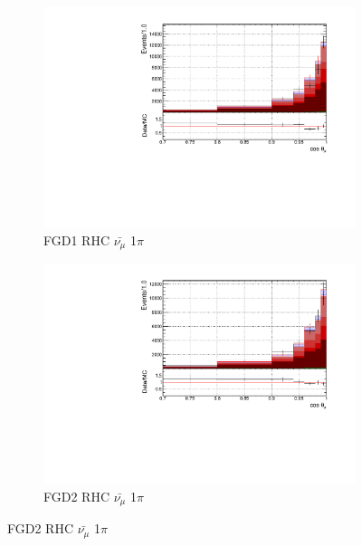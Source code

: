 \begin{figure}[!htbp]
\begin{subfigure}{0.49\textwidth}
  \centering
  \includegraphics[width=\textwidth]{figs/FGD1_anti-numuCC_1pi_t}
  \caption{FGD1 RHC $\bar{\nu_{\mu}}$ 1$\pi$}
\end{subfigure}
\centering
\begin{subfigure}{0.49\textwidth}
  \centering
  \includegraphics[width=\textwidth]{figs/FGD2_anti-numuCC_1pi_t}
  \caption{FGD2 RHC $\bar{\nu_{\mu}}$ 1$\pi$}
\end{subfigure}


\end{figure}
